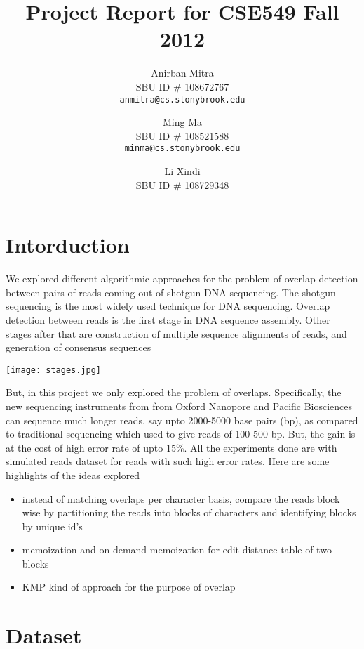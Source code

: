 \documentclass{article}
\title{Project Report for CSE549 Fall 2012}
\author{Anirban Mitra \\
SBU ID \# 108672767 \\
{\tt anmitra@cs.stonybrook.edu} \\
\and
Ming Ma \\
SBU ID \# 108521588 \\
{\tt minma@cs.stonybrook.edu} \\
\and
Li Xindi \\
SBU ID \# 108729348}
\begin{document}
    \maketitle
    
    \section{Intorduction}
    
        We explored different algorithmic approaches for the problem of overlap detection between pairs of reads coming out of shotgun DNA sequencing. The shotgun sequencing is the most widely used technique for DNA sequencing. Overlap detection between reads is the first stage in DNA sequence assembly. Other stages after that are construction of multiple sequence alignments of reads, and generation of consensus sequences \\
        
        \begin{center}
            \texttt{[image: stages.jpg]}
        \end{center}
        
        But, in this project we only explored the problem of overlaps. Specifically, the new sequencing instruments from from Oxford Nanopore and Pacific Biosciences can sequence much longer reads, say upto 2000-5000 base pairs (bp), as compared to traditional sequencing which used to give reads of 100-500 bp. But, the gain is at the cost of high error rate of upto 15\%. All the experiments done are with simulated reads dataset for reads with such high error rates. Here are some highlights of the ideas explored 
        
        \begin{itemize}
            \item instead of matching overlaps per character basis, compare the reads block wise by partitioning the reads into blocks of characters and identifying blocks by unique id's
            \item memoization and on demand memoization for edit distance table of two blocks
            \item KMP kind of approach for the purpose of overlap 
        \end{itemize}
        
    \section{Dataset}
    
\end{document}

